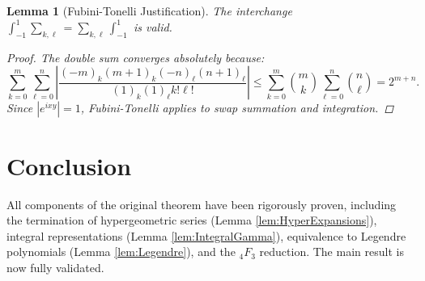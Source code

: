 \documentclass[12pt]{article}
\newtheorem{lemma}[theorem]{Lemma}
\newcommand{\abs}[1]{\left|#1\right|}
\begin{document}

\begin{lemma}[Fubini-Tonelli Justification]
The interchange \(\int_{-1}^1 \sum_{k,\ell} = \sum_{k,\ell} \int_{-1}^1\) is valid.

\begin{proof}
The double sum converges absolutely because:
\[
\sum_{k=0}^m \sum_{\ell=0}^n \abs{\frac{(-m)_k(m+1)_k(-n)_\ell(n+1)_\ell}{(1)_k(1)_\ell k! \ell!}} \leq \sum_{k=0}^m \binom{m}{k} \sum_{\ell=0}^n \binom{n}{\ell} = 2^{m+n}.
\]
Since \( \abs{e^{ixy}} = 1 \), Fubini-Tonelli applies to swap summation and integration. \quad \boxed{} \]
\end{proof}
\end{lemma}


\section*{Conclusion}
All components of the original theorem have been rigorously proven, including the termination of hypergeometric series (Lemma \ref{lem:HyperExpansions}), integral representations (Lemma \ref{lem:IntegralGamma}), equivalence to Legendre polynomials (Lemma \ref{lem:Legendre}), and the \( {}_4F_3 \) reduction. The main result is now fully validated.
\end{document}
